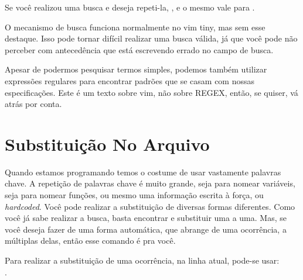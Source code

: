 Se você realizou uma busca e deseja repeti-la, \vimcommand{//}, e o mesmo vale para .

O mecanismo de busca funciona normalmente no vim tiny, mas sem esse destaque.
Isso pode tornar difícil realizar uma busca válida, já que você pode não perceber com antecedência
que está escrevendo errado no campo de busca.


Apesar de podermos pesquisar termos simples, podemos também utilizar expressões regulares para encontrar padrões que se casam com nossas especificações.
Este é um texto sobre vim, não sobre REGEX, então, se quiser, vá atrás por conta.

\section{Substituição No Arquivo}
Quando estamos programando temos o costume de usar vastamente palavras chave.
A repetição de palavras chave é muito grande, seja para nomear variáveis, seja para nomear funções,
ou mesmo uma informação escrita à força, ou \textit{hardcoded}.
Você pode realizar a substituição de diversas formas diferentes.
Como você já sabe realizar a busca, basta encontrar e substituir uma a uma.
Mas, se você deseja fazer de uma forma automática, que abrange de uma ocorrência, a múltiplas delas, então esse comando é pra você.

Para realizar a substituição de uma ocorrência, na linha atual, pode-se usar:\\
.

